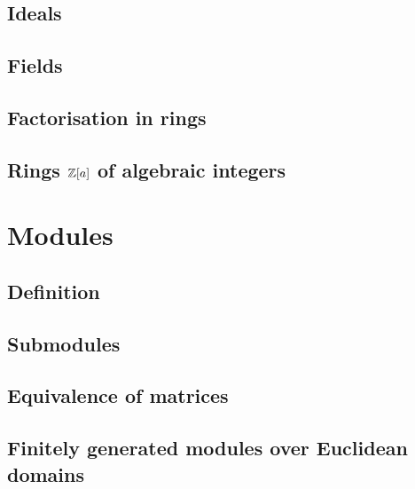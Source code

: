 \documentclass[main.tex]{subfiles}
\begin{document}
			\subsection{Ideals}
			
			\subsection{Fields}
			
			\subsection{Factorisation in rings}
			
			\subsection{Rings $\mathbb Z[a]$ of algebraic integers}
			
		\section{Modules}
			\subsection{Definition}
			
			\subsection{Submodules}
			
			\subsection{Equivalence of matrices}
			
			\subsection{Finitely generated modules over Euclidean domains}
\end{document}
